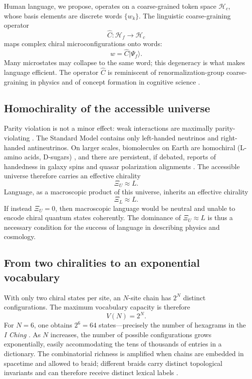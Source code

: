 \documentclass[11pt,a4paper]{article}
\begin{document}
Human language, we propose, operates on a coarse-grained token space $\mathcal{H}_c$, whose basis elements are discrete words $\{w_k\}$. The linguistic coarse-graining operator
\begin{equation}
\hat C: \mathcal{H}_f \to \mathcal{H}_c
\end{equation}
maps complex chiral microconfigurations onto words:
\begin{equation}
w = \hat C |\Psi_f\rangle.
\end{equation}
Many microstates may collapse to the same word; this degeneracy is what makes language efficient. The operator $\hat C$ is reminiscent of renormalization-group coarse-graining in physics \cite{goldenfeld92} and of concept formation in cognitive science \cite{gardenfors00}.

\subsection{Homochirality of the accessible universe}

Parity violation is not a minor effect: weak interactions are maximally parity-violating \cite{wu57, glashow61, salam68}. The Standard Model contains only left-handed neutrinos and right-handed antineutrinos. On larger scales, biomolecules on Earth are homochiral (L-amino acids, D-sugars) \cite{pasteur48, kondepudi85, cronin97}, and there are persistent, if debated, reports of handedness in galaxy spins and quasar polarization alignments \cite{longo11, hutsemekers05}. The accessible universe therefore carries an effective chirality
\begin{equation}
\Xi_U \approx L.
\end{equation}
Language, as a macroscopic product of this universe, inherits an effective chirality
\begin{equation}
\Xi_L \approx L.
\end{equation}
If instead $\Xi_U = 0$, then macroscopic language would be neutral and unable to encode chiral quantum states coherently. The dominance of $\Xi_U \approx L$ is thus a necessary condition for the success of language in describing physics and cosmology.

\subsection{From two chiralities to an exponential vocabulary}

With only two chiral states per site, an $N$-site chain has $2^N$ distinct configurations. The maximum vocabulary capacity is therefore
\begin{equation}
V(N) = 2^N.
\end{equation}
For $N=6$, one obtains $2^6=64$ states---precisely the number of hexagrams in the \emph{I Ching} \cite{wilhelm50}. As $N$ increases, the number of possible configurations grows exponentially, easily accommodating the tens of thousands of entries in a dictionary. The combinatorial richness is amplified when chains are embedded in spacetime and allowed to braid; different braids carry distinct topological invariants and can therefore receive distinct lexical labels \cite{mermin79, read99}.
\end{document}
